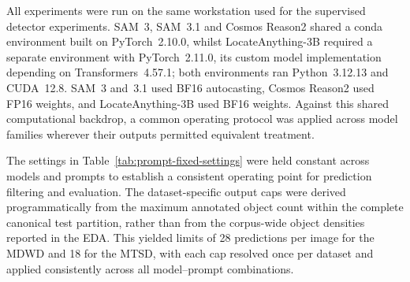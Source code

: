 All experiments were run on the same workstation used for the supervised detector experiments. \gls{SAM}~3, \gls{SAM}~3.1 and Cosmos Reason2 shared a conda environment built on PyTorch~2.10.0, whilst LocateAnything-3B required a separate environment with PyTorch~2.11.0, its custom model implementation depending on Transformers~4.57.1; both environments ran Python~3.12.13 and \gls{CUDA}~12.8. \gls{SAM}~3 and~3.1 used \gls{BF16} autocasting, Cosmos Reason2 used \gls{FP16} weights, and LocateAnything-3B used \gls{BF16} weights. Against this shared computational backdrop, a common operating protocol was applied across model families wherever their outputs permitted equivalent treatment.

\newpage
\noindent The settings in Table~\ref{tab:prompt-fixed-settings} were held constant across models and prompts to establish a consistent operating point for prediction filtering and evaluation. The dataset-specific output caps were derived programmatically from the maximum annotated object count within the complete canonical test partition, rather than from the corpus-wide object densities reported in the \gls{EDA}. This yielded limits of 28 predictions per image for the \gls{MDWD} and 18 for the \gls{MTSD}, with each cap resolved once per dataset and applied consistently across all model--prompt combinations.

